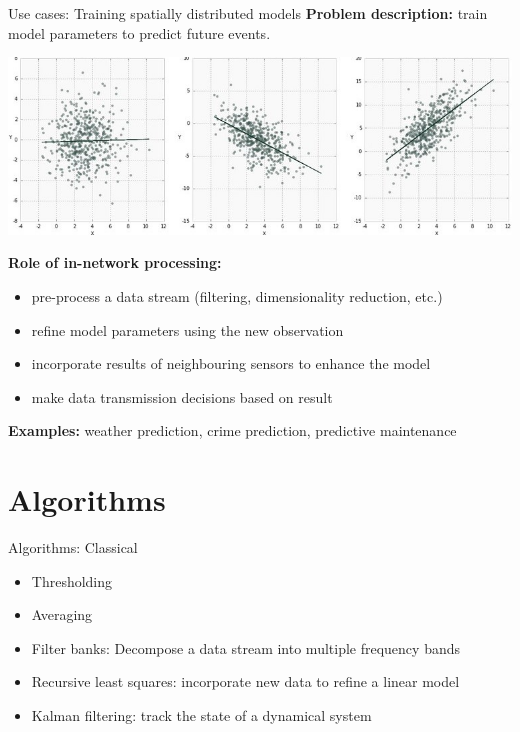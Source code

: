 \documentclass{beamer}
\begin{document}
    \begin{frame}{Use cases: Training spatially distributed models}
        \vspace*{0cm}
        {\bf Problem description:} train model parameters to predict future events.
        \begin{center}
            \includegraphics[scale=0.3]{figures/pearson-correlation-3-examples.jpg}
        \end{center}
        \vfill 
        {\bf Role of in-network processing:} 
        \begin{itemize}
            \item pre-process a data stream (filtering, dimensionality reduction, etc.)
            \item refine model parameters using the new observation
            \item incorporate results of neighbouring sensors to enhance the model 
            \item make data transmission decisions based on result
        \end{itemize}
        \vfill 
        {\bf Examples:} weather prediction, crime prediction, predictive maintenance 
    \end{frame}
    
\section{Algorithms}
    
    \begin{frame}{Algorithms: Classical}
        \begin{itemize}
            \item Thresholding
            \item Averaging
            \item Filter banks: Decompose a data stream into multiple frequency bands
            \item Recursive least squares: incorporate new data to refine a linear model
            \item Kalman filtering: track the state of a dynamical system
        \end{itemize}
    \end{frame}
    
\end{document}
